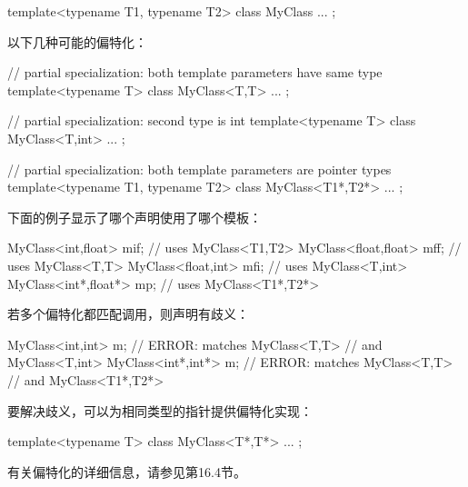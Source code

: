 \begin{cpp}
template<typename T1, typename T2>
class MyClass {
	...
};
\end{cpp}

以下几种可能的偏特化：

\begin{cpp}
// partial specialization: both template parameters have same type
template<typename T>
class MyClass<T,T> {
	...
};

// partial specialization: second type is int
template<typename T>
class MyClass<T,int> {
	...
};

// partial specialization: both template parameters are pointer types
template<typename T1, typename T2>
class MyClass<T1*,T2*> {
	...
};
\end{cpp}

下面的例子显示了哪个声明使用了哪个模板：

\begin{cpp}
MyClass<int,float> mif; // uses MyClass<T1,T2>
MyClass<float,float> mff; // uses MyClass<T,T>
MyClass<float,int> mfi; // uses MyClass<T,int>
MyClass<int*,float*> mp; // uses MyClass<T1*,T2*>
\end{cpp}

若多个偏特化都匹配调用，则声明有歧义：

\begin{cpp}
MyClass<int,int> m; // ERROR: matches MyClass<T,T>
					// and MyClass<T,int>
MyClass<int*,int*> m; // ERROR: matches MyClass<T,T>
					  // and MyClass<T1*,T2*>
\end{cpp}

要解决歧义，可以为相同类型的指针提供偏特化实现：

\begin{cpp}
template<typename T>
class MyClass<T*,T*> {
	...
};
\end{cpp}

有关偏特化的详细信息，请参见第16.4节。






